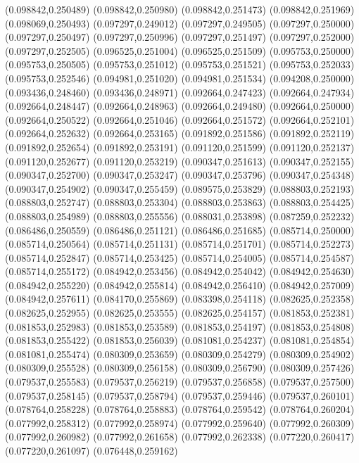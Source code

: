 (0.098842,0.250489)
(0.098842,0.250980)
(0.098842,0.251473)
(0.098842,0.251969)
(0.098069,0.250493)
(0.097297,0.249012)
(0.097297,0.249505)
(0.097297,0.250000)
(0.097297,0.250497)
(0.097297,0.250996)
(0.097297,0.251497)
(0.097297,0.252000)
(0.097297,0.252505)
(0.096525,0.251004)
(0.096525,0.251509)
(0.095753,0.250000)
(0.095753,0.250505)
(0.095753,0.251012)
(0.095753,0.251521)
(0.095753,0.252033)
(0.095753,0.252546)
(0.094981,0.251020)
(0.094981,0.251534)
(0.094208,0.250000)
(0.093436,0.248460)
(0.093436,0.248971)
(0.092664,0.247423)
(0.092664,0.247934)
(0.092664,0.248447)
(0.092664,0.248963)
(0.092664,0.249480)
(0.092664,0.250000)
(0.092664,0.250522)
(0.092664,0.251046)
(0.092664,0.251572)
(0.092664,0.252101)
(0.092664,0.252632)
(0.092664,0.253165)
(0.091892,0.251586)
(0.091892,0.252119)
(0.091892,0.252654)
(0.091892,0.253191)
(0.091120,0.251599)
(0.091120,0.252137)
(0.091120,0.252677)
(0.091120,0.253219)
(0.090347,0.251613)
(0.090347,0.252155)
(0.090347,0.252700)
(0.090347,0.253247)
(0.090347,0.253796)
(0.090347,0.254348)
(0.090347,0.254902)
(0.090347,0.255459)
(0.089575,0.253829)
(0.088803,0.252193)
(0.088803,0.252747)
(0.088803,0.253304)
(0.088803,0.253863)
(0.088803,0.254425)
(0.088803,0.254989)
(0.088803,0.255556)
(0.088031,0.253898)
(0.087259,0.252232)
(0.086486,0.250559)
(0.086486,0.251121)
(0.086486,0.251685)
(0.085714,0.250000)
(0.085714,0.250564)
(0.085714,0.251131)
(0.085714,0.251701)
(0.085714,0.252273)
(0.085714,0.252847)
(0.085714,0.253425)
(0.085714,0.254005)
(0.085714,0.254587)
(0.085714,0.255172)
(0.084942,0.253456)
(0.084942,0.254042)
(0.084942,0.254630)
(0.084942,0.255220)
(0.084942,0.255814)
(0.084942,0.256410)
(0.084942,0.257009)
(0.084942,0.257611)
(0.084170,0.255869)
(0.083398,0.254118)
(0.082625,0.252358)
(0.082625,0.252955)
(0.082625,0.253555)
(0.082625,0.254157)
(0.081853,0.252381)
(0.081853,0.252983)
(0.081853,0.253589)
(0.081853,0.254197)
(0.081853,0.254808)
(0.081853,0.255422)
(0.081853,0.256039)
(0.081081,0.254237)
(0.081081,0.254854)
(0.081081,0.255474)
(0.080309,0.253659)
(0.080309,0.254279)
(0.080309,0.254902)
(0.080309,0.255528)
(0.080309,0.256158)
(0.080309,0.256790)
(0.080309,0.257426)
(0.079537,0.255583)
(0.079537,0.256219)
(0.079537,0.256858)
(0.079537,0.257500)
(0.079537,0.258145)
(0.079537,0.258794)
(0.079537,0.259446)
(0.079537,0.260101)
(0.078764,0.258228)
(0.078764,0.258883)
(0.078764,0.259542)
(0.078764,0.260204)
(0.077992,0.258312)
(0.077992,0.258974)
(0.077992,0.259640)
(0.077992,0.260309)
(0.077992,0.260982)
(0.077992,0.261658)
(0.077992,0.262338)
(0.077220,0.260417)
(0.077220,0.261097)
(0.076448,0.259162)
